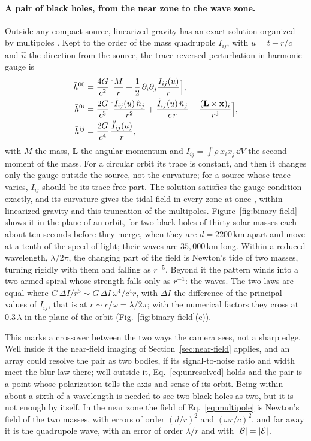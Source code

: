 \paragraph{A pair of black holes, from the near zone to the wave zone.} Outside any compact
source, linearized gravity has an exact solution organized by multipoles
\cite{Thorne1980}. Kept to the order of the mass quadrupole $I_{ij}$, with
$u = t - r/c$ and $\hat n$ the direction from the source, the trace-reversed
perturbation in harmonic gauge is
\begin{equation}\label{eq:multipole}
\begin{aligned}
\bar h^{00} &= \frac{4G}{c^2}\Bigl[\frac{M}{r} + \frac{1}{2}\,\partial_i\partial_j\frac{I_{ij}(u)}{r}\Bigr],\\
\bar h^{0i} &= \frac{2G}{c^3}\Bigl[\frac{\dot I_{ij}(u)\,\hat n_j}{r^2} + \frac{\ddot I_{ij}(u)\,\hat n_j}{c\,r}
+ \frac{(\mathbf L\times\mathbf x)_i}{r^3}\Bigr],\\
\bar h^{ij} &= \frac{2G}{c^4}\,\frac{\ddot I_{ij}(u)}{r},
\end{aligned}
\end{equation}
with $M$ the mass, $\mathbf L$ the angular momentum and $I_{ij} = \int\rho\,
x_ix_j\,\dd V$ the second moment of the mass. For a circular orbit its trace
is constant, and then it changes only the gauge outside the source, not the
curvature; for a source whose trace
varies, $I_{ij}$ should be its trace-free part. The solution satisfies the gauge
condition exactly, and its curvature gives the tidal field in every zone at once
\cite{Teukolsky1982}, within linearized gravity and this truncation of the
multipoles. Figure~\ref{fig:binary-field} shows it in the plane
of an orbit, for two black holes of thirty solar masses each about ten seconds
before they merge, when they are $d = 2200\,\mathrm{km}$ apart and move at a tenth
of the speed of light; their waves are $35{,}000\,\mathrm{km}$ long. Within a
reduced wavelength, $\lambda/2\pi$, the changing part of the field is Newton's
tide of two masses, turning rigidly with them and falling as $r^{-5}$. Beyond
it the pattern winds into a two-armed spiral whose strength falls only as
$r^{-1}$: the waves. The two laws are equal where
$G\,\Delta I/r^5 \sim G\,\Delta I\,\omega^4/c^4 r$, with $\Delta I$ the difference of the principal values of $I_{ij}$, that is at $r \sim c/\omega = \lambda/2\pi$; with the
numerical factors they cross at $0.3\,\lambda$ in the plane of the orbit
(Fig.~\ref{fig:binary-field}(c)).

This marks a crossover between the two ways the camera sees, not a sharp
edge. Well inside it the near-field imaging of Section~\ref{sec:near-field}
applies, and an array could resolve the pair as two bodies, if its
signal-to-noise ratio and width meet the blur law there; well outside it,
Eq.~\eqref{eq:unresolved} holds and the pair is a point whose polarization
tells the axis and sense of its orbit. Being within about a sixth of a
wavelength is needed to see two black holes as two, but it is not enough by
itself. In the near zone the field of Eq.~\eqref{eq:multipole} is Newton's
field of the two masses, with errors of order $(d/r)^2$ and $(\omega r/c)^2$, and far away it is
the quadrupole wave, with an error of order $\lambda/r$ and with
$|\mathcal{B}| = |\mathcal{E}|$.

